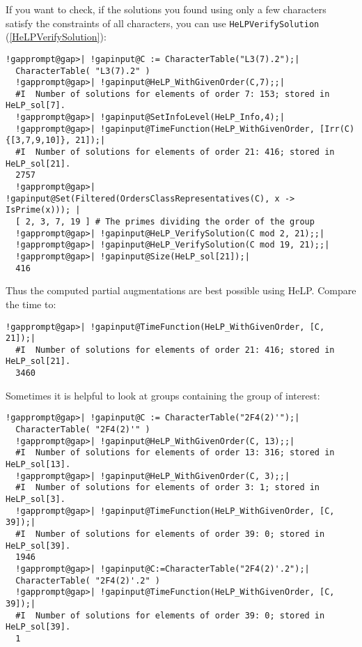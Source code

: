 \documentclass[a4paper,11pt]{report}
\begin{document}
{{ If you want to check, if the solutions you found using only a few characters
satisfy the constraints of all characters, you can use \texttt{HeLP{\textunderscore}VerifySolution} (\ref{HeLPVerifySolution}): 
\begin{Verbatim}[commandchars=!@|,fontsize=\small,frame=single,label=Example]
  !gapprompt@gap>| !gapinput@C := CharacterTable("L3(7).2");|
  CharacterTable( "L3(7).2" )
  !gapprompt@gap>| !gapinput@HeLP_WithGivenOrder(C,7);;|
  #I  Number of solutions for elements of order 7: 153; stored in HeLP_sol[7].
  !gapprompt@gap>| !gapinput@SetInfoLevel(HeLP_Info,4);|
  !gapprompt@gap>| !gapinput@TimeFunction(HeLP_WithGivenOrder, [Irr(C){[3,7,9,10]}, 21]);|
  #I  Number of solutions for elements of order 21: 416; stored in HeLP_sol[21].
  2757
  !gapprompt@gap>| !gapinput@Set(Filtered(OrdersClassRepresentatives(C), x -> IsPrime(x))); |
  [ 2, 3, 7, 19 ] # The primes dividing the order of the group
  !gapprompt@gap>| !gapinput@HeLP_VerifySolution(C mod 2, 21);;|
  !gapprompt@gap>| !gapinput@HeLP_VerifySolution(C mod 19, 21);;|
  !gapprompt@gap>| !gapinput@Size(HeLP_sol[21]);|
  416
\end{Verbatim}
 Thus the computed partial augmentations are best possible using HeLP. Compare
the time to: 
\begin{Verbatim}[commandchars=!@|,fontsize=\small,frame=single,label=Example]
  !gapprompt@gap>| !gapinput@TimeFunction(HeLP_WithGivenOrder, [C, 21]);|
  #I  Number of solutions for elements of order 21: 416; stored in HeLP_sol[21].
  3460
\end{Verbatim}
 Sometimes it is helpful to look at groups containing the group of interest: 
\begin{Verbatim}[commandchars=!@|,fontsize=\small,frame=single,label=Example]
  !gapprompt@gap>| !gapinput@C := CharacterTable("2F4(2)'");|
  CharacterTable( "2F4(2)'" )
  !gapprompt@gap>| !gapinput@HeLP_WithGivenOrder(C, 13);;|
  #I  Number of solutions for elements of order 13: 316; stored in HeLP_sol[13].
  !gapprompt@gap>| !gapinput@HeLP_WithGivenOrder(C, 3);;|
  #I  Number of solutions for elements of order 3: 1; stored in HeLP_sol[3].
  !gapprompt@gap>| !gapinput@TimeFunction(HeLP_WithGivenOrder, [C, 39]);|
  #I  Number of solutions for elements of order 39: 0; stored in HeLP_sol[39].
  1946
  !gapprompt@gap>| !gapinput@C:=CharacterTable("2F4(2)'.2");|
  CharacterTable( "2F4(2)'.2" )
  !gapprompt@gap>| !gapinput@TimeFunction(HeLP_WithGivenOrder, [C, 39]);|
  #I  Number of solutions for elements of order 39: 0; stored in HeLP_sol[39].
  1
\end{Verbatim}
}}
\end{document}

